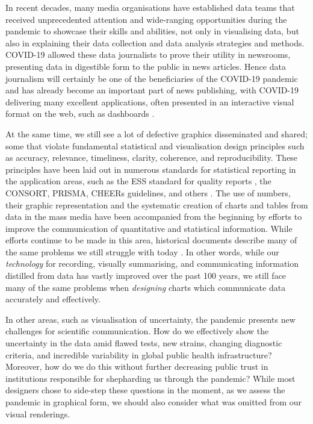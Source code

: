\documentclass[article]{jdssv}\usepackage[]{graphicx}\usepackage[]{color}
\begin{document}
In recent decades, many media organisations have established data teams that received unprecedented attention and wide-ranging opportunities during the pandemic to showcase their skills and abilities, not only in visualising data, but also in explaining their data collection and data analysis strategies and methods. COVID-19 allowed these data journalists to prove their utility in newsrooms, presenting data in digestible form to the public in news articles. Hence data journalism will certainly be one of the beneficiaries of the COVID-19 pandemic and has already become an important part of news publishing, with COVID-19 delivering many excellent applications, often presented in an interactive visual format on the web, such as dashboards \citep{kochWelcomeRevolutionCOVID192021}.


At the same time, we still see a lot of defective graphics disseminated and shared; some that violate fundamental statistical and visualisation design principles such as accuracy, relevance, timeliness, clarity, coherence, and reproducibility. 
These principles have been laid out in numerous standards for statistical reporting in the application areas, such as the ESS standard for quality reports \citep{ess2009}, the CONSORT, PRISMA, CHEERs guidelines, and others \citep{EQUATORNetworkEnhancing}. 
The use of numbers, their graphic representation and the systematic creation of charts and tables from data in the mass media have been accompanied from the beginning by efforts to improve the communication of quantitative and statistical information. While efforts continue to be made in this area, historical documents describe many of the same problems we still struggle with today \citep{ASA-standards,haemerPresentationProblemsArea1949,kovermanPLANNINGVISUALPRESENTATION1961,fienbergGraphicalMethodsStatistics1979,Hoffrage2261,Tufte2001,Rosling2011,otavamylona2020}.
In other words, while our \textit{technology} for recording, visually summarising, and communicating information distilled from data has vastly improved over the past 100 years, we still face many of the same problems when \textit{designing} charts which communicate data accurately and effectively.

In other areas, such as visualisation of uncertainty, the pandemic presents new challenges for scientific communication. How do we effectively show the uncertainty in the data amid flawed tests, new strains, changing diagnostic criteria, and incredible variability in global public health infrastructure? Moreover, how do we do this without further decreasing public trust in institutions responsible for shepharding us through the pandemic? While most designers chose to side-step these questions in the moment, as we assess the pandemic in graphical form, we should also consider what was omitted from our visual renderings.
\end{document}

